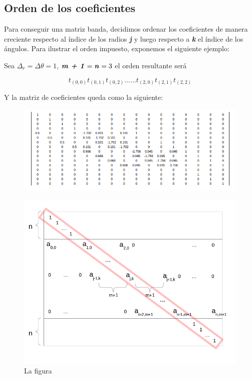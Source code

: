 \subsection{Orden de los coeficientes}

Para conseguir una matriz banda, decidimos ordenar los coeficientes de manera creciente respecto al índice de los radios \textbf{\textit{j}} y luego respecto a \textbf{\textit{k}} el índice de los ángulos. Para ilustrar el orden impuesto, exponemos el siguiente ejemplo:

Sea $\Delta_{r} = \Delta{\theta} = 1$, $\textbf{\textit{m + 1}} = \textbf{\textit{n}} = 3$ el orden resultante será 

$$ t_{(0,0)} t_{(0,1)} t_{(0,2)} ...... t_{(2,0)} t_{(2,1)} t_{(2,2)} $$

Y la matriz de coeficientes queda como la siguiente:\\



\begin{figure}[h]
  \includegraphics[width=\textwidth]{imagenes/matrizEjemplo.png}
\end{figure}



\begin{figure}[h]
  \includegraphics[scale=0.4]{imagenes/figura1.png}
  \caption{La figura}
  \label{fig:corteHorno}
\end{figure}

